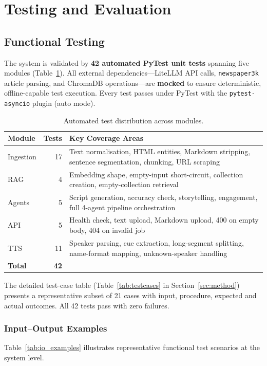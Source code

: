 \documentclass[sigconf,natbib=false]{acmart}   %
\begin{document}
\section{Testing and Evaluation}
\label{sec:testing}

\subsection{Functional Testing}
The system is validated by \textbf{42 automated PyTest unit tests} spanning five modules (Table~\ref{tab:test_summary}).  All external dependencies---LiteLLM API calls, \texttt{newspaper3k} article parsing, and ChromaDB operations---are \textbf{mocked} to ensure deterministic, offline-capable test execution.  Every test passes under PyTest with the \texttt{pytest-asyncio} plugin (auto mode).

\begin{table}[H]
\centering
\begin{tabular}{lrl}
\toprule
\textbf{Module} & \textbf{Tests} & \textbf{Key Coverage Areas}\\
\midrule
Ingestion   & 17 & Text normalisation, HTML entities, Markdown stripping, sentence segmentation, chunking, URL scraping\\
RAG         &  4 & Embedding shape, empty-input short-circuit, collection creation, empty-collection retrieval\\
Agents      &  5 & Script generation, accuracy check, storytelling, engagement, full 4-agent pipeline orchestration\\
API         &  5 & Health check, text upload, Markdown upload, 400 on empty body, 404 on invalid job\\
TTS         & 11 & Speaker parsing, cue extraction, long-segment splitting, name-format mapping, unknown-speaker handling\\
\midrule
\textbf{Total} & \textbf{42} & \\
\bottomrule
\end{tabular}
\caption{Automated test distribution across modules.}
\label{tab:test_summary}
\end{table}

The detailed test-case table (Table~\ref{tab:testcases} in Section~\ref{sec:method}) presents a representative subset of 21 cases with input, procedure, expected and actual outcomes.  All 42 tests pass with zero failures.

\subsubsection{Input--Output Examples}
Table~\ref{tab:io_examples} illustrates representative functional test scenarios at the system level.
\end{document}
